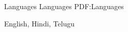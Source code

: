 \documentclass[letterpaper,MMMyyyy,nonstopmode]{simpleresumecv}
\begin{document}
\begin{Body}






\Section
{Languages}
{Languages}
{PDF:Languages}

English, Hindi, Telugu








\end{Body}
\end{document}
